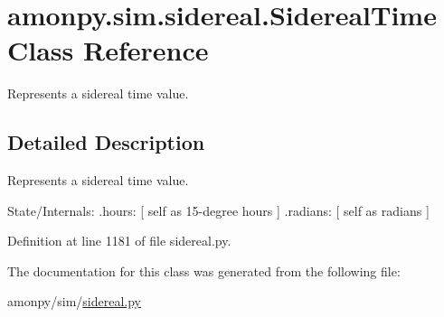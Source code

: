 \hypertarget{classamonpy_1_1sim_1_1sidereal_1_1_sidereal_time}{\section{amonpy.\-sim.\-sidereal.\-Sidereal\-Time Class Reference}
\label{classamonpy_1_1sim_1_1sidereal_1_1_sidereal_time}
}


Represents a sidereal time value.  




\subsection{Detailed Description}
Represents a sidereal time value. 

State/\-Internals\-: .hours\-: \mbox{[} self as 15-\/degree hours \mbox{]} .radians\-: \mbox{[} self as radians \mbox{]} 

Definition at line 1181 of file sidereal.\-py.



The documentation for this class was generated from the following file\-:\begin{DoxyCompactItemize}
\item 
amonpy/sim/\hyperlink{sidereal_8py}{sidereal.\-py}\end{DoxyCompactItemize}
